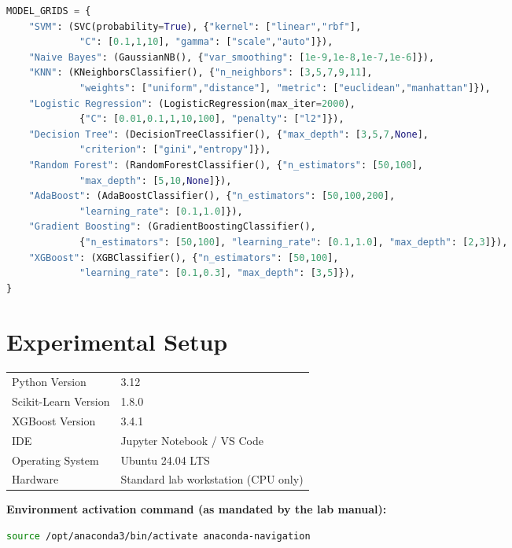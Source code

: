 \documentclass[12pt,a4paper]{article}
\newenvironment{fitwidth}
  {\begin{lrbox}{\fitbox}}
  {\end{lrbox}\ifdim\wd\fitbox>\linewidth\resizebox{\linewidth}{!}{\usebox{\fitbox}}\else\usebox{\fitbox}\fi}
\DeclareRobustCommand{\_}{\textunderscore\allowbreak}
\begin{document}
\begin{lstlisting}[language=Python, caption={Hyperparameter grids, from \texttt{experiment7\_pca\_model\_comparison.py}.}]
MODEL_GRIDS = {
    "SVM": (SVC(probability=True), {"kernel": ["linear","rbf"],
             "C": [0.1,1,10], "gamma": ["scale","auto"]}),
    "Naive Bayes": (GaussianNB(), {"var_smoothing": [1e-9,1e-8,1e-7,1e-6]}),
    "KNN": (KNeighborsClassifier(), {"n_neighbors": [3,5,7,9,11],
             "weights": ["uniform","distance"], "metric": ["euclidean","manhattan"]}),
    "Logistic Regression": (LogisticRegression(max_iter=2000),
             {"C": [0.01,0.1,1,10,100], "penalty": ["l2"]}),
    "Decision Tree": (DecisionTreeClassifier(), {"max_depth": [3,5,7,None],
             "criterion": ["gini","entropy"]}),
    "Random Forest": (RandomForestClassifier(), {"n_estimators": [50,100],
             "max_depth": [5,10,None]}),
    "AdaBoost": (AdaBoostClassifier(), {"n_estimators": [50,100,200],
             "learning_rate": [0.1,1.0]}),
    "Gradient Boosting": (GradientBoostingClassifier(),
             {"n_estimators": [50,100], "learning_rate": [0.1,1.0], "max_depth": [2,3]}),
    "XGBoost": (XGBClassifier(), {"n_estimators": [50,100],
             "learning_rate": [0.1,0.3], "max_depth": [3,5]}),
}
\end{lstlisting}

\section{Experimental Setup}
\begin{center}
\begin{minipage}{\linewidth}\centering
\begin{fitwidth}
\begin{tabular}{ll}
\toprule
Python Version & 3.12 \\
Scikit-Learn Version & 1.8.0 \\
XGBoost Version & 3.4.1 \\
IDE & Jupyter Notebook / VS Code \\
Operating System & Ubuntu 24.04 LTS \\
Hardware & Standard lab workstation (CPU only) \\
\bottomrule
\end{tabular}
\end{fitwidth}
\end{minipage}
\end{center}

\vspace{0.3cm}
\textbf{Environment activation command (as mandated by the lab manual):}
\begin{lstlisting}[language=bash]
source /opt/anaconda3/bin/activate anaconda-navigation
\end{lstlisting}
\end{document}
